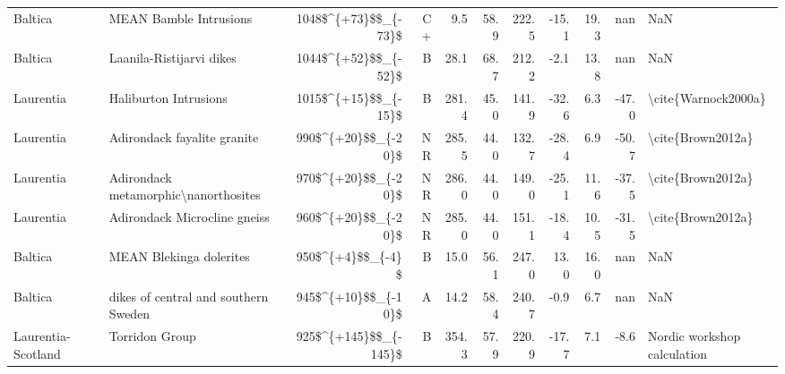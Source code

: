 \begin{longtable}{p{1 in}p{1 in}rrrrrrrr}
                       Baltica &                             MEAN Bamble Intrusions &   1048\$\textasciicircum \{+73\}\$\$\_\{-73\}\$ &     C+ &       9.5 &      58.9 & 222.5 & -15.1 &      19.3 &         nan &                                                NaN \\
                       Baltica &                           Laanila-Ristijarvi dikes &   1044\$\textasciicircum \{+52\}\$\$\_\{-52\}\$ &      B &      28.1 &      68.7 & 212.2 &  -2.1 &      13.8 &         nan &                                                NaN \\
                     Laurentia &                              Haliburton Intrusions &   1015\$\textasciicircum \{+15\}\$\$\_\{-15\}\$ &      B &     281.4 &      45.0 & 141.9 & -32.6 &       6.3 &       -47.0 &                                \textbackslash cite\{Warnock2000a\} \\
                     Laurentia &                        Adirondack fayalite granite &    990\$\textasciicircum \{+20\}\$\$\_\{-20\}\$ &     NR &     285.5 &      44.0 & 132.7 & -28.4 &       6.9 &       -50.7 &                                  \textbackslash cite\{Brown2012a\} \\
                     Laurentia &               Adirondack metamorphic\textbackslash nanorthosites &    970\$\textasciicircum \{+20\}\$\$\_\{-20\}\$ &     NR &     286.0 &      44.0 & 149.0 & -25.1 &      11.6 &       -37.5 &                                  \textbackslash cite\{Brown2012a\} \\
                     Laurentia &                       Adirondack Microcline gneiss &    960\$\textasciicircum \{+20\}\$\$\_\{-20\}\$ &     NR &     285.0 &      44.0 & 151.1 & -18.4 &      10.5 &       -31.5 &                                  \textbackslash cite\{Brown2012a\} \\
                       Baltica &                            MEAN Blekinga dolerites &      950\$\textasciicircum \{+4\}\$\$\_\{-4\}\$ &      B &      15.0 &      56.1 & 247.0 &  13.0 &      16.0 &         nan &                                                NaN \\
                       Baltica &               dikes of central and southern Sweden &    945\$\textasciicircum \{+10\}\$\$\_\{-10\}\$ &      A &      14.2 &      58.4 & 240.7 &  -0.9 &       6.7 &         nan &                                                NaN \\
            Laurentia-Scotland &                                     Torridon Group &  925\$\textasciicircum \{+145\}\$\$\_\{-145\}\$ &      B &     354.3 &      57.9 & 220.9 & -17.7 &       7.1 &        -8.6 &                        Nordic workshop calculation \\

\end{longtable}
